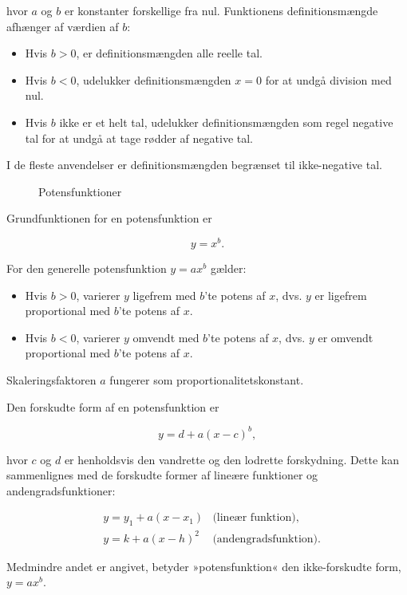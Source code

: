 hvor \(a\) og \(b\) er konstanter forskellige fra nul. Funktionens definitionsmængde afhænger af værdien af \(b\):
\begin{itemize}
    \item Hvis \(b > 0\), er definitionsmængden alle reelle tal.
    \item Hvis \(b < 0\), udelukker definitionsmængden \(x = 0\) for at undgå division med nul.
    \item Hvis \(b\) ikke er et helt tal, udelukker definitionsmængden som regel negative tal for at undgå at tage rødder af negative tal.
\end{itemize}
I de fleste anvendelser er definitionsmængden begrænset til ikke-negative tal.

\begin{figure}[htbp]
    \centering
    \resizebox{\textwidth}{!}{\DaPowerPanels}
    \caption{Potensfunktioner}
    \label{fig:book_image3}
\end{figure}

Grundfunktionen for en potensfunktion er

\[
y = x^b.
\]

For den generelle potensfunktion \(y = ax^b\) gælder:
\begin{itemize}
    \item Hvis \(b > 0\), varierer \(y\) ligefrem med \(b\)'te potens af \(x\), dvs. \(y\) er ligefrem proportional med \(b\)'te potens af \(x\).
    \item Hvis \(b < 0\), varierer \(y\) omvendt med \(b\)'te potens af \(x\), dvs. \(y\) er omvendt proportional med \(b\)'te potens af \(x\).
\end{itemize}

Skaleringsfaktoren \(a\) fungerer som proportionalitetskonstant.

Den forskudte form af en potensfunktion er

\[
y = d + a(x - c)^b,
\]

hvor \(c\) og \(d\) er henholdsvis den vandrette og den lodrette forskydning. Dette kan sammenlignes med de forskudte former af lineære funktioner og andengradsfunktioner:

\[
\begin{aligned}
& y = y_1 + a(x - x_1) &\text{(lineær funktion)}, \\
& y = k + a(x - h)^2 &\text{(andengradsfunktion)}.
\end{aligned}
\]

Medmindre andet er angivet, betyder »potensfunktion« den ikke-forskudte form, \(y = ax^b\).

